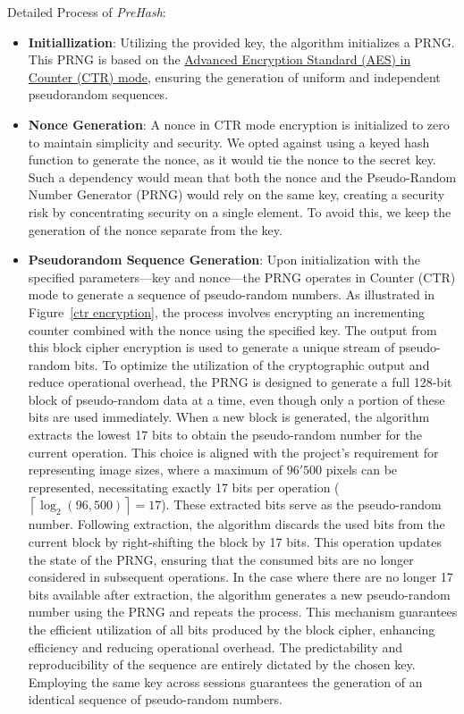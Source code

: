 Detailed Process of \textit{PreHash}:
\begin{itemize}
    \item \textbf{Initiallization}: Utilizing the provided key, the algorithm initializes a PRNG. This PRNG is based on the \hyperref[def:AES CTR mode]{Advanced Encryption Standard (AES) in Counter (CTR) mode}, ensuring the generation of uniform and independent pseudorandom sequences.

    \item \textbf{Nonce Generation}: A nonce in CTR mode encryption is initialized to zero to maintain simplicity and security. We opted against using a keyed hash function to generate the nonce, as it would tie the nonce to the secret key. Such a dependency would mean that both the nonce and the Pseudo-Random Number Generator (PRNG) would rely on the same key, creating a security risk by concentrating security on a single element. To avoid this, we keep the generation of the nonce separate from the key.

    \item \textbf{Pseudorandom Sequence Generation}: Upon initialization with the specified parameters—key and nonce—the PRNG operates in Counter (CTR) mode to generate a sequence of pseudo-random numbers. As illustrated in Figure~\ref{ctr encryption}, the process involves encrypting an incrementing counter combined with the nonce using the specified key. The output from this block cipher encryption is used to generate a unique stream of pseudo-random bits.
    To optimize the utilization of the cryptographic output and reduce operational overhead, the PRNG is designed to generate a full 128-bit block of pseudo-random data at a time, even though only a portion of these bits are used immediately. When a new block is generated, the algorithm extracts the lowest 17 bits to obtain the pseudo-random number for the current operation. This choice is aligned with the project's requirement for representing image sizes, where a maximum of \(96'500\) pixels can be represented, necessitating exactly 17 bits per operation (\(\left\lceil \log_2(96,500) \right\rceil = 17\)). These extracted bits serve as the pseudo-random number.
    Following extraction, the algorithm discards the used bits from the current block by right-shifting the block by 17 bits. This operation updates the state of the PRNG, ensuring that the consumed bits are no longer considered in subsequent operations. In the case where there are no longer 17 bits available after extraction, the algorithm generates a new pseudo-random number using the PRNG and repeats the process. This mechanism guarantees the efficient utilization of all bits produced by the block cipher, enhancing efficiency and reducing operational overhead.
    The predictability and reproducibility of the sequence are entirely dictated by the chosen key. Employing the same key across sessions guarantees the generation of an identical sequence of pseudo-random numbers.
    

\end{itemize}
